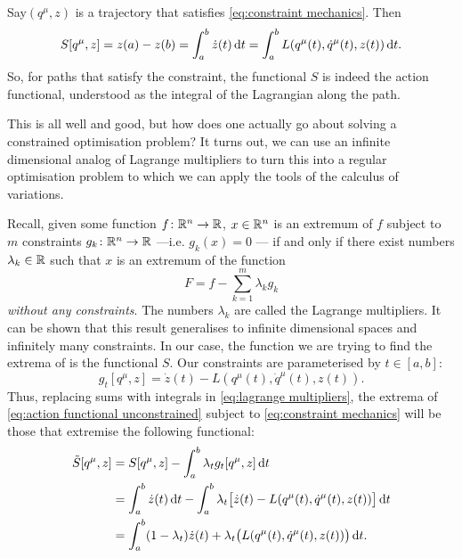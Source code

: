 \documentclass[../main.tex]{subfiles}
\begin{document}
Say\( (q^\mu, z) \) is a trajectory that satisfies \cref{eq:constraint mechanics}. Then 
\begin{equation*}
	S[q^\mu, z] = z(a) - z(b) = \int_a^b \dot{z}(t) \,\mathrm{d} t = \int_a^b L(q^\mu(t),
	\dot{q}^\mu(t), z(t)) \,\mathrm{d} t. 
\end{equation*}
So, for paths that satisfy the constraint, the functional \( S \) is indeed the
action functional, understood as the integral of the Lagrangian along the path.

This is all well and good, but how does one actually go about solving a constrained
optimisation problem? It turns out, we can use an infinite dimensional analog of Lagrange
multipliers to turn this into a regular optimisation problem to which we can apply the
tools of the calculus of variations. 

Recall, given some function \( f \colon \mathbb{R}^n \to \mathbb{R} \), \( x \in \mathbb{R}^n \) is an extremum of
\( f \) subject to \( m \) constraints \( g_k \colon \mathbb{R}^n \to \mathbb{R} \) ---i.e. \( g_k(x) = 0
\) --- if and only if there exist numbers \( \lambda_k \in \mathbb{R} \) such that
\( x \) is an extremum of the function
\begin{equation} \label{eq:lagrange multipliers}
	 F = f - \sum_{k = 1}^{m}\lambda_k g_k 
\end{equation}
\emph{without any constraints}. The numbers \( \lambda_k \) are called the Lagrange
multipliers. It can be shown that this result generalises to infinite dimensional spaces
and infinitely many constraints. In our case, the function we are trying to find the
extrema of is the functional \( S \). Our constraints are parameterised by \( t \in [a,b]
\):
\begin{equation*}
	g_t[q^\mu, z] = \dot{z}(t) - L(q^\mu(t), \dot{q}^\mu(t), z(t)).
\end{equation*}
Thus, replacing sums with integrals in \cref{eq:lagrange multipliers}, the extrema of
\cref{eq:action functional unconstrained} subject to \cref{eq:constraint mechanics} will
be those that extremise the following functional: 
\begin{align} \label{eq:lagrange multiplier action}
	\tilde{S}[q^\mu, z] & = S[q^\mu, z] - \int_a^b \lambda_t g_t[q^\mu, z] \,\mathrm{d} t \nonumber \\
											& = \int_a^b \dot{z}(t) \,\mathrm{d} t - \int_a^b \lambda_t\big[\dot{z}(t) -
											L(q^\mu(t), \dot{q}^\mu(t), z(t))\big] \,\mathrm{d} t \nonumber \\
											& = \int_a^b (1 - \lambda_t) \dot{z}(t) + \lambda_t\big(L(q^\mu(t),
											\dot{q}^\mu(t), z(t))\big) \,\mathrm{d} t.
\end{align}
\end{document}
